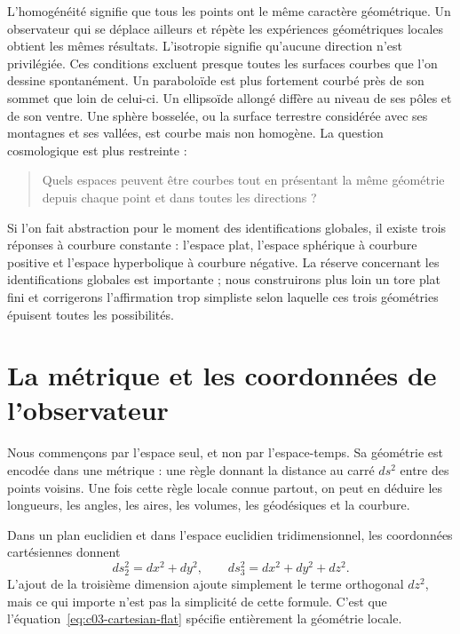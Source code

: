 L’homogénéité signifie que tous les points ont le même caractère géométrique. Un observateur qui se déplace ailleurs et répète les expériences géométriques locales obtient les mêmes résultats. L’isotropie signifie qu’aucune direction n’est privilégiée. Ces conditions excluent presque toutes les surfaces courbes que l’on dessine spontanément. Un paraboloïde est plus fortement courbé près de son sommet que loin de celui-ci. Un ellipsoïde allongé diffère au niveau de ses pôles et de son ventre. Une sphère bosselée, ou la surface terrestre considérée avec ses montagnes et ses vallées, est courbe mais non homogène. La question cosmologique est plus restreinte :
\begin{quote}
Quels espaces peuvent être courbes tout en présentant la même géométrie depuis chaque point et dans toutes les directions ?
\end{quote}

Si l’on fait abstraction pour le moment des identifications globales, il existe trois réponses à courbure constante : l’espace plat, l’espace sphérique à courbure positive et l’espace hyperbolique à courbure négative. La réserve concernant les identifications globales est importante ; nous construirons plus loin un tore plat fini et corrigerons l’affirmation trop simpliste selon laquelle ces trois géométries épuisent toutes les possibilités.

\section{La métrique et les coordonnées de l’observateur}

Nous commençons par l’espace seul, et non par l’espace-temps. Sa géométrie est encodée dans une métrique : une règle donnant la distance au carré \(ds^2\) entre des points voisins. Une fois cette règle locale connue partout, on peut en déduire les longueurs, les angles, les aires, les volumes, les géodésiques et la courbure.

Dans un plan euclidien et dans l’espace euclidien tridimensionnel, les coordonnées cartésiennes donnent
\begin{equation}
ds_2^2=dx^2+dy^2,
\qquad
ds_3^2=dx^2+dy^2+dz^2.
\label{eq:c03-cartesian-flat}
\end{equation}
L’ajout de la troisième dimension ajoute simplement le terme orthogonal \(dz^2\), mais ce qui importe n’est pas la simplicité de cette formule. C’est que l’équation~\eqref{eq:c03-cartesian-flat} spécifie entièrement la géométrie locale.

